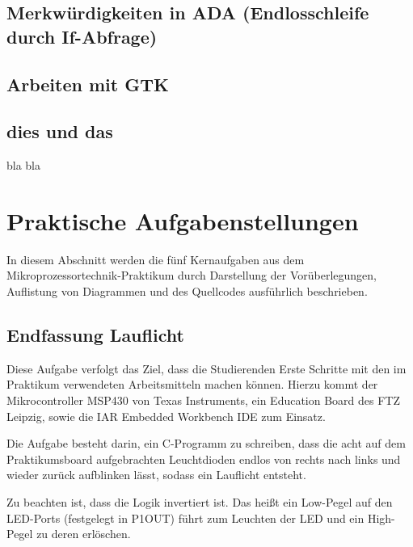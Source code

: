 \documentclass[12pt,a4paper,bibliography=totocnumbered,listof=totocnumbered]{scrartcl}
\begin{document}
\subsection{Merkwürdigkeiten in ADA (Endlosschleife durch If-Abfrage)}

\subsection{Arbeiten mit GTK}








\subsection{dies und das}
bla bla

\pagebreak


\section{Praktische Aufgabenstellungen}

In diesem Abschnitt werden die fünf Kernaufgaben aus dem Mikroprozessortechnik-Praktikum durch Darstellung der Vorüberlegungen, Auflistung von Diagrammen und des Quellcodes ausführlich beschrieben.

\subsection{Endfassung Lauflicht}
Diese Aufgabe verfolgt das Ziel, dass die Studierenden Erste Schritte mit den im Praktikum verwendeten Arbeitsmitteln machen können.
Hierzu kommt der Mikrocontroller MSP430 von Texas Instruments, ein Education Board des FTZ Leipzig, sowie die IAR Embedded Workbench IDE zum Einsatz.

Die Aufgabe besteht darin, ein C-Programm zu schreiben, dass die acht auf dem Praktikumsboard aufgebrachten Leuchtdioden endlos von rechts nach links und wieder zurück aufblinken lässt, sodass ein Lauflicht entsteht.

Zu beachten ist, dass die Logik invertiert ist. Das heißt ein Low-Pegel auf den LED-Ports (festgelegt in P1OUT) führt zum Leuchten der LED und ein High-Pegel zu deren erlöschen.
\end{document}
